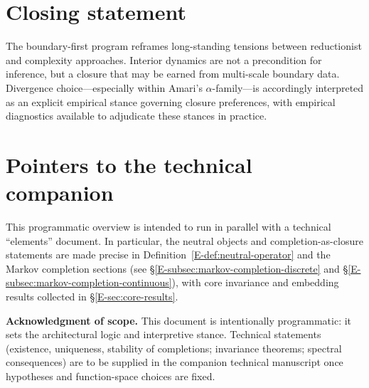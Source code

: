 \documentclass[11pt]{article}
\providecommand{\Eref}[1]{\ref{E-#1}}
\begin{document}
\section{Closing statement}
The boundary-first program reframes long-standing tensions between reductionist and complexity
approaches. Interior dynamics are not a precondition for inference, but a closure that may be earned
from multi-scale boundary data. Divergence choice---especially within Amari's $\alpha$-family---is
accordingly interpreted as an explicit empirical stance governing closure preferences, with empirical
diagnostics available to adjudicate these stances in practice.

\section*{Pointers to the technical companion}
This programmatic overview is intended to run in parallel with a technical ``elements'' document.
In particular, the neutral objects and completion-as-closure statements are made precise in
Definition~\Eref{def:neutral-operator} and the Markov completion sections
(see \S\Eref{subsec:markov-completion-discrete} and \S\Eref{subsec:markov-completion-continuous}),
with core invariance and embedding results collected in \S\Eref{sec:core-results}.

\vspace{1em}
\noindent\textbf{Acknowledgment of scope.} This document is intentionally programmatic: it sets the
architectural logic and interpretive stance. Technical statements (existence, uniqueness, stability of
completions; invariance theorems; spectral consequences) are to be supplied in the companion technical
manuscript once hypotheses and function-space choices are fixed.

\printbibliography
\end{document}
